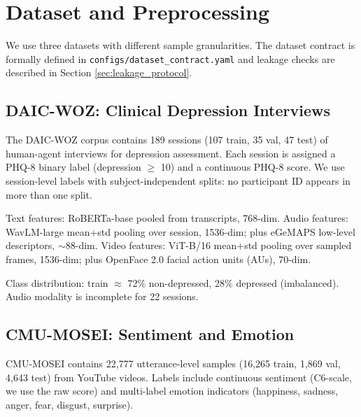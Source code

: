 \documentclass[12pt,oneside]{book}
\begin{document}
\section{Dataset and Preprocessing}
\label{sec:dataset}

We use three datasets with different sample granularities. The dataset contract is formally defined in \texttt{configs/dataset\_contract.yaml} and leakage checks are described in Section \ref{sec:leakage_protocol}.

\subsection{DAIC-WOZ: Clinical Depression Interviews}
\label{sec:daic}

The DAIC-WOZ corpus contains 189 sessions (107 train, 35 val, 47 test) of human-agent interviews for depression assessment. Each session is assigned a PHQ-8 binary label (depression $\ge$ 10) and a continuous PHQ-8 score. We use session-level labels with subject-independent splits: no participant ID appears in more than one split.

Text features: RoBERTa-base \citep{liu2019roberta} pooled from transcripts, 768-dim. Audio features: WavLM-large \citep{chen2022wavlm} mean+std pooling over session, 1536-dim; plus eGeMAPS \citep{eyben2016geneva} low-level descriptors, $\sim$88-dim. Video features: ViT-B/16 \citep{dosovitskiy2020image} mean+std pooling over sampled frames, 1536-dim; plus OpenFace 2.0 \citep{baltrusaitis2018openface} facial action units (AUs), 70-dim.

Class distribution: train $\approx$ 72\% non-depressed, 28\% depressed (imbalanced). Audio modality is incomplete for 22 sessions.

\subsection{CMU-MOSEI: Sentiment and Emotion}
\label{sec:mosei}

CMU-MOSEI \citep{zadeh2018multimodal} contains 22,777 utterance-level samples (16,265 train, 1,869 val, 4,643 test) from YouTube videos. Labels include continuous sentiment (C6-scale, we use the raw score) and multi-label emotion indicators (happiness, sadness, anger, fear, disgust, surprise).
\end{document}
